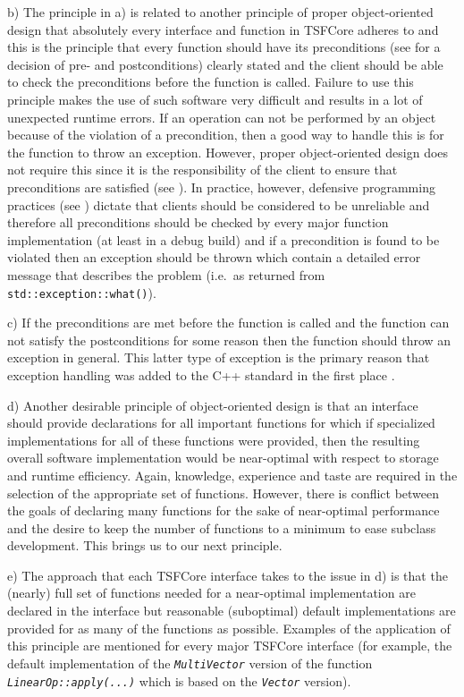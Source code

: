 b) The principle in a) is related to another principle of proper
object-oriented design that absolutely every interface and function in
TSFCore adheres to and this is the principle that every function should
have its preconditions (see {}\cite{ref:uml_distilled_2nd_ed} for a
decision of pre- and postconditions) clearly stated and the client
should be able to check the preconditions before the function is called.
Failure to use this principle makes the use of such software very
difficult and results in a lot of unexpected runtime errors.  If an
operation can not be performed by an object because of the violation
of a precondition, then a good way to handle this is for the function to
throw an exception.  However, proper object-oriented design does not
require this since it is the responsibility of the client to ensure
that preconditions are satisfied (see
{}\cite{ref:uml_distilled_2nd_ed}).  In practice, however, defensive
programming practices (see {}\cite{ref:stroustrup_1997}) dictate that
clients should be considered to be unreliable and therefore all
preconditions should be checked by every major function implementation
(at least in a debug build) and if a precondition is found to be
violated then an exception should be thrown which contain a detailed
error message that describes the problem (i.e.~as returned from
{}\texttt{std::exception::what()}).

c) If the preconditions are met before the function is called and the
function can not satisfy the postconditions for some reason then the
function should throw an exception in general.  This latter type of
exception is the primary reason that exception handling was added to
the C++ standard in the first place {}\cite{ref:design_evol_cpp}.

d) Another desirable principle of object-oriented design is that an
interface should provide declarations for all important functions for
which if specialized implementations for all of these functions were
provided, then the resulting overall software implementation would be
near-optimal with respect to storage and runtime efficiency.  Again,
knowledge, experience and taste are required in the selection of the
appropriate set of functions.  However, there is conflict between the
goals of declaring many functions for the sake of near-optimal
performance and the desire to keep the number of functions to a minimum
to ease subclass development.  This brings us to our next principle.

e) The approach that each TSFCore interface takes to the issue in d)
is that the (nearly) full set of functions needed for a near-optimal
implementation are declared in the interface but reasonable
(suboptimal) default implementations are provided for as many of the
functions as possible.  Examples of the application of this principle
are mentioned for every major TSFCore interface (for example, the
default implementation of the {}\texttt{\textit{Multi\-Vector}}
version of the function {}\texttt{\textit{LinearOp\-::apply(\-...)}} 
which is based on the {}\texttt{\textit{Vector}} version).

